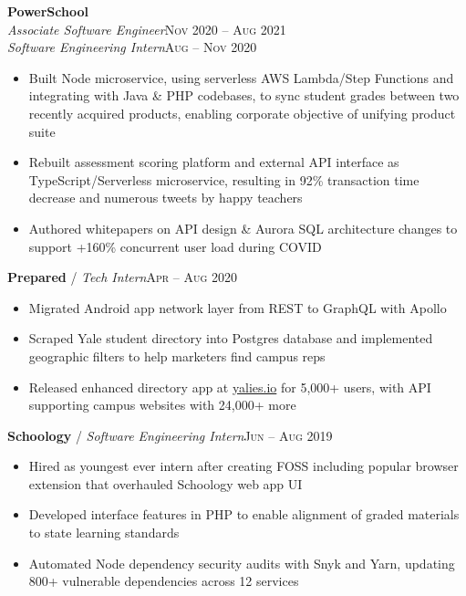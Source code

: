 \documentclass[10pt, a4paper]{article}
\begin{document}
\textbf{PowerSchool}\\
\textit{Associate Software Engineer}\hfill \textsc{Nov 2020 -- Aug 2021}\\
\textit{Software Engineering Intern}\hfill \textsc{Aug -- Nov 2020}\\
\begin{itemize}
    \vspace{-7mm}
    \item Built Node microservice, using serverless AWS Lambda/Step Functions and integrating with Java \& PHP codebases, to sync student grades between two recently acquired products, enabling corporate objective of unifying product suite
    \item Rebuilt assessment scoring platform and external API interface as TypeScript/Serverless microservice, resulting in 92\% transaction time decrease and numerous tweets by happy teachers
    \item Authored whitepapers on API design \& Aurora SQL architecture changes to support +160\% concurrent user load during COVID
\end{itemize}

\textbf{Prepared} / \textit{Tech Intern}\hfill \textsc{Apr -- Aug 2020}\\
\begin{itemize}
    \vspace{-7mm}
    \item Migrated Android app network layer from REST to GraphQL with Apollo
    \item Scraped Yale student directory into Postgres database and implemented geographic filters to help marketers find campus reps
    \item Released enhanced directory app at \href{https://yalies.io}{yalies.io} for 5,000+ users, with API supporting campus websites with 24,000+ more
\end{itemize}

\textbf{Schoology} / \textit{Software Engineering Intern}\hfill \textsc{Jun -- Aug 2019}\\
\begin{itemize}
    \vspace{-7mm}
    \item Hired as youngest ever intern after creating FOSS including popular browser extension that overhauled Schoology web app UI
    \item Developed interface features in PHP to enable alignment of graded materials to state learning standards
    \item Automated Node dependency security audits with Snyk and Yarn, updating 800+ vulnerable dependencies across 12 services
\end{itemize}
\end{document}
